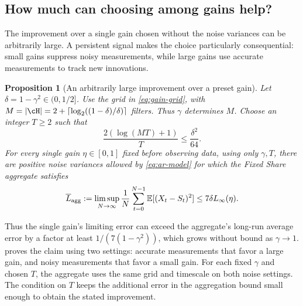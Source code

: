 \documentclass[11pt,twoside]{article}
\newcommand{\E}{\mathbb E}
\newtheorem{proposition}[theorem]{Proposition}
\theoremstyle{definition}
\theoremstyle{remark}
\begin{document}
\subsection{How much can choosing among gains help?}

The improvement over a single gain chosen without the noise variances can
be arbitrarily large. A persistent signal makes the choice particularly
consequential: small gains suppress noisy measurements, while large gains
use accurate measurements to track new innovations.

\begin{proposition}[An arbitrarily large improvement over a preset gain]
\label{ex:ar-preset-gain}
Let $\delta=1-\gamma^2\in(0,1/2]$. Use the grid in
\cref{eq:gain-grid}, with
$M=|\cH|=2+\lceil\log_2((1-\delta)/\delta)\rceil$ filters.
Thus $\gamma$ determines $M$. Choose an integer $T\ge2$ such that
\begin{equation}
 \frac{2(\log(MT)+1)}T\le\frac{\delta^2}{64}.
 \label{eq:ar-comparison-timescale}
\end{equation}
For every single gain $\eta\in[0,1]$ fixed before observing data, using
only $\gamma,T$, there are positive noise variances allowed by \cref{eq:ar-model}
for which the Fixed Share aggregate satisfies
\begin{equation}
 \overline L_{\rm agg}
 :=\limsup_{N\to\infty}\frac1N\sum_{t=0}^{N-1}\E[(X_t-S_t)^2]
 \le 7\delta L_\infty(\eta).
 \label{eq:ar-preset-comparison}
\end{equation}
\end{proposition}

Thus the single gain's limiting error can exceed the aggregate's long-run
average error by a factor at least $1/(7(1-\gamma^2))$, which grows without
bound as $\gamma\to1$.  proves the claim
using two settings: accurate measurements that favor a large gain, and
noisy measurements that favor a small gain. For each fixed $\gamma$ and
chosen $T$, the aggregate uses the same grid and timescale on both noise
settings. The condition on $T$ keeps
the additional error in the aggregation bound small enough to obtain the
stated improvement.
\label{en:unknown-persistence}
\end{document}

